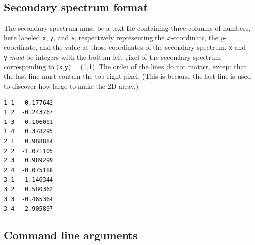 \documentclass{article}
\newcommand{\x}{\texttt{x}}
\newcommand{\y}{\texttt{y}}
\newcommand{\s}{\texttt{s}}
\begin{document}
\subsection{Secondary spectrum format}

The secondary spectrum must be a text file containing three columns of numbers, here labeled \x{}, \y{}, and \s{}, respectively representing the $x$-coordinate, the $y$-coordinate, and the value at those coordinates of the secondary spectrum.
\x{} and \y{} \emph{must} be integers with the bottom-left pixel of the secondary spectrum corresponding to (\x{},\y{}) = (1,1).
The order of the lines do not matter, except that the last line must contain the top-right pixel.
(This is because the last line is used to discover how large to make the 2D array.)

\begin{lstlisting}[frame=single,title=Example secondary spectrum file with dimensions (3:4)]
1 1   0.177642
1 2  -0.243767
1 3   0.106081
1 4   0.378295
2 1   0.988884
2 2  -1.071105
2 3   0.989299
2 4  -0.075188
3 1   1.146344
3 2   0.580362
3 3  -0.465364
3 4   2.905897
\end{lstlisting}

\subsection{Command line arguments}
\end{document}
